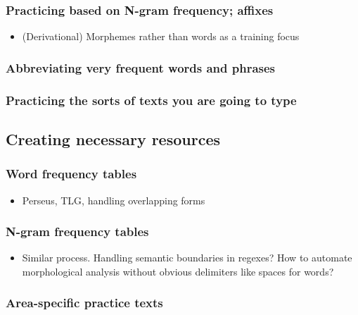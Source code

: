 \documentclass[11pt]{article}
\begin{document}
\subsubsection{Practicing based on N-gram frequency; affixes}
\label{sec:org01cca89}

\begin{itemize}
\item (Derivational) Morphemes rather than words as a training focus
\end{itemize}

\subsubsection{Abbreviating very frequent words and phrases}
\label{sec:orge985f7c}

\subsubsection{Practicing the sorts of texts you are going to type}
\label{sec:orgc17d377}

\subsection{Creating necessary resources}
\label{sec:orga5708bc}

\subsubsection{Word frequency tables}
\label{sec:org85cab90}

\begin{itemize}
\item Perseus, TLG, handling overlapping forms
\end{itemize}

\subsubsection{N-gram frequency tables}
\label{sec:org93788b8}

\begin{itemize}
\item Similar process. Handling semantic boundaries in regexes? How to automate morphological analysis without obvious delimiters like spaces for words?
\end{itemize}

\subsubsection{Area-specific practice texts}
\label{sec:org7f17a68}
\end{document}
